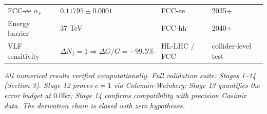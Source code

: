 \documentclass[
  11pt,
]{article}
\begin{document}
\begin{longtable}[]{@{}llll@{}}
\begin{minipage}[t]{0.22\columnwidth}\raggedright
FCC-ee \(\alpha_s\)\strut
\end{minipage} & \begin{minipage}[t]{0.22\columnwidth}\raggedright
\(0.11795 \pm 0.0001\)\strut
\end{minipage} & \begin{minipage}[t]{0.22\columnwidth}\raggedright
FCC-ee\strut
\end{minipage} & \begin{minipage}[t]{0.22\columnwidth}\raggedright
2035+\strut
\end{minipage}\tabularnewline
\begin{minipage}[t]{0.22\columnwidth}\raggedright
Energy barrier\strut
\end{minipage} & \begin{minipage}[t]{0.22\columnwidth}\raggedright
\(37\) TeV\strut
\end{minipage} & \begin{minipage}[t]{0.22\columnwidth}\raggedright
FCC-hh\strut
\end{minipage} & \begin{minipage}[t]{0.22\columnwidth}\raggedright
2040+\strut
\end{minipage}\tabularnewline
\begin{minipage}[t]{0.22\columnwidth}\raggedright
VLF sensitivity\strut
\end{minipage} & \begin{minipage}[t]{0.22\columnwidth}\raggedright
\(\Delta N_f = 1 \Rightarrow \Delta G/G = -99.5\%\)\strut
\end{minipage} & \begin{minipage}[t]{0.22\columnwidth}\raggedright
HL-LHC / FCC\strut
\end{minipage} & \begin{minipage}[t]{0.22\columnwidth}\raggedright
collider-level test\strut
\end{minipage}\tabularnewline
\bottomrule
\end{longtable}

\bigskip

\emph{All numerical results verified computationally. Full validation
suite: Stages 1--14 (Section 3). Stage 12 proves \(c = 1\) via
Coleman-Weinberg; Stage 13 quantifies the error budget at
\(0.05\sigma\); Stage 14 confirms compatibility with precision Casimir
data. The derivation chain is closed with zero hypotheses.}

\bigskip
\end{document}
